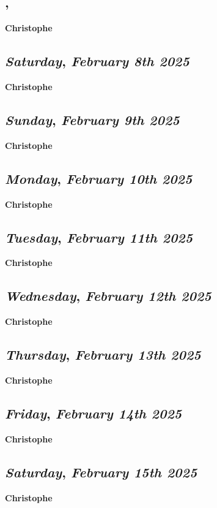 \subsection*{\weekday, \day}
\textbf {Christophe}

\def\day{\textit{February 8th 2025}}
\def\weekday{\textit{Saturday}}
\subsection*{\weekday, \day}
\textbf {Christophe}

\def\day{\textit{February 9th 2025}}
\def\weekday{\textit{Sunday}}
\subsection*{\weekday, \day}
\textbf {Christophe}

\def\day{\textit{February 10th 2025}}
\def\weekday{\textit{Monday}}
\subsection*{\weekday, \day}
\textbf {Christophe}

\def\day{\textit{February 11th 2025}}
\def\weekday{\textit{Tuesday}}
\subsection*{\weekday, \day}
\textbf {Christophe}

\def\day{\textit{February 12th 2025}}
\def\weekday{\textit{Wednesday}}
\subsection*{\weekday, \day}
\textbf {Christophe}

\def\day{\textit{February 13th 2025}}
\def\weekday{\textit{Thursday}}
\subsection*{\weekday, \day}
\textbf {Christophe}

\def\day{\textit{February 14th 2025}}
\def\weekday{\textit{Friday}}
\subsection*{\weekday, \day}
\textbf {Christophe}

\def\day{\textit{February 15th 2025}}
\def\weekday{\textit{Saturday}}
\subsection*{\weekday, \day}
\textbf {Christophe}


